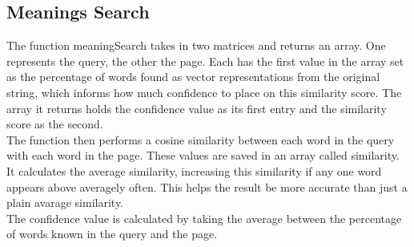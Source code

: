 \subsection{Meanings Search}
The function meaningSearch takes in two matrices and returns an array. One represents the query, the other the page. Each has the first value in the array set as the percentage of words found as vector representations from the original string, which informs how much confidence to place on this similarity score. The array it returns holds the confidence value as its first entry and the similarity score as the second.\\

The function then performs a cosine similarity between each word in the query with each word in the page. These values are saved in an array called similarity. It calculates the average similarity, increasing this similarity if any one word appears above averagely often. This helps the result be more accurate than just a plain avarage similarity.\\
The confidence value is calculated by taking the average between the percentage of words known in the query and the page.  
